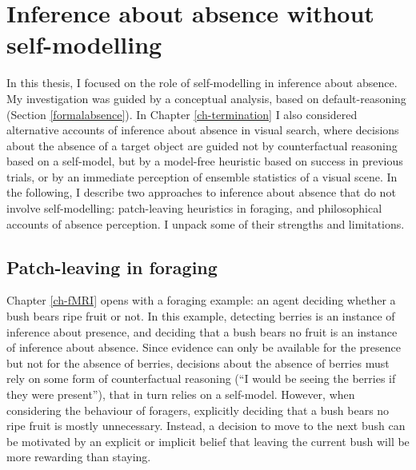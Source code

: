 \documentclass[12pt,twoside]{reedthesis}
\begin{document}
\hypertarget{withoutselfmodel}{%
\section*{Inference about absence without self-modelling}\label{withoutselfmodel}}

In this thesis, I focused on the role of self-modelling in inference about absence. My investigation was guided by a conceptual analysis, based on default-reasoning (Section \ref{formalabsence}). In Chapter \ref{ch-termination} I also considered alternative accounts of inference about absence in visual search, where decisions about the absence of a target object are guided not by counterfactual reasoning based on a self-model, but by a model-free heuristic based on success in previous trials, or by an immediate perception of ensemble statistics of a visual scene. In the following, I describe two approaches to inference about absence that do not involve self-modelling: patch-leaving heuristics in foraging, and philosophical accounts of absence perception. I unpack some of their strengths and limitations.

\hypertarget{patch}{%
\subsection*{Patch-leaving in foraging}\label{patch}}

Chapter \ref{ch-fMRI} opens with a foraging example: an agent deciding whether a bush bears ripe fruit or not. In this example, detecting berries is an instance of inference about presence, and deciding that a bush bears no fruit is an instance of inference about absence. Since evidence can only be available for the presence but not for the absence of berries, decisions about the absence of berries must rely on some form of counterfactual reasoning (``I would be seeing the berries if they were present''), that in turn relies on a self-model. However, when considering the behaviour of foragers, explicitly deciding that a bush bears no ripe fruit is mostly unnecessary. Instead, a decision to move to the next bush can be motivated by an explicit or implicit belief that leaving the current bush will be more rewarding than staying.
\end{document}
